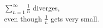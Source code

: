 \documentclass[border=6pt]{standalone}
\begin{document}
\parbox{2in}{$\displaystyle\sum_{n=1}^\infty \frac{1}{n}$ diverges, \\
even though $\displaystyle\frac{1}{n}$ gets very small.}
\end{document}
